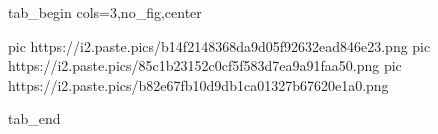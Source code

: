  
 
 
 
 


\ifcmt
  tab_begin cols=3,no_fig,center

     pic https://i2.paste.pics/b14f2148368da9d05f92632ead846e23.png
		 pic https://i2.paste.pics/85c1b23152c0cf5f583d7ea9a91faa50.png
		 pic https://i2.paste.pics/b82e67fb10d9db1ca01327b67620e1a0.png

  tab_end
\fi
